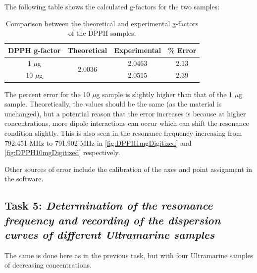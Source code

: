 \documentclass{article}
\begin{document}
The following table shows the calculated g-factors for the two samples:

\begin{table}[h]
	\centering
	\begin{tabular}{|c|c|c|c|}
	\hline
	DPPH g-factor & Theoretical             & Experimental & \% Error \\ \hline
	1 $\mu$g      & \multirow{2}{*}{2.0036} & 2.0463       & 2.13     \\ \cline{1-1} \cline{3-4} 
	10 $\mu$g     &                         & 2.0515       & 2.39     \\ \hline
	\end{tabular}
\caption{Comparison between the theoretical and experimental g-factors of the DPPH samples.}
\end{table}

The percent error for the 10 $\mu$g sample is slightly higher than that of the 1 $\mu$g sample. Theoretically, the values should be the same (as the material is unchanged), but a potential reason that the error increases is because at higher concentrations, more dipole interactions can occur which can shift the resonance condition slightly.
This is also seen in the resonance frequency increasing from 792.451 MHz to 791.902 MHz in \ref{fig:DPPH1mgDigitized} and \ref{fig:DPPH10mgDigitized} respectively.

Other sources of error include the calibration of the axes and point assignment in the software. 

\pagebreak{}

\subsection{Task 5: \textit{Determination of the resonance frequency and recording of the dispersion
curves of different Ultramarine samples}}

The same is done here as in the previous task, but with four Ultramarine samples of decreasing concentrations.
\end{document}
